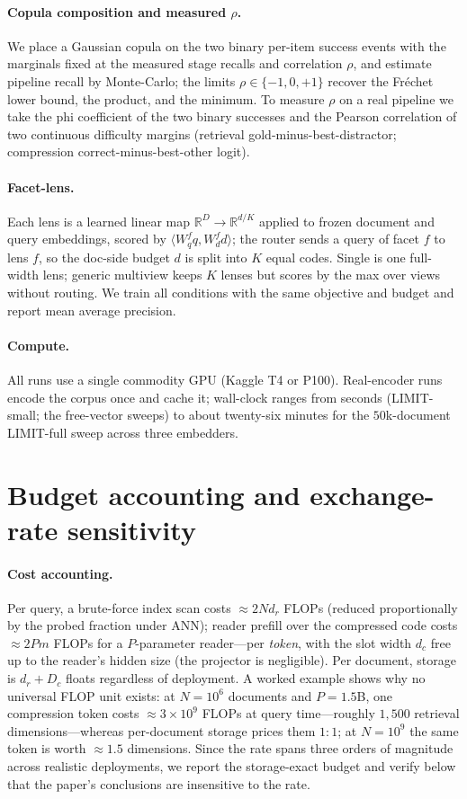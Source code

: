 \documentclass{article}
\newcommand{\dr}{d_r}
\newcommand{\dc}{d_c}
\newcommand{\R}{\mathbb{R}}
\newcommand{\ip}[2]{\langle #1, #2\rangle}
\begin{document}
\paragraph{Copula composition and measured $\rho$.} We place a Gaussian copula on the two binary
per-item success events with the marginals fixed at the measured stage recalls and correlation
$\rho$, and estimate pipeline recall by Monte-Carlo; the limits $\rho\in\{-1,0,+1\}$ recover the
Fr\'echet lower bound, the product, and the minimum. To measure $\rho$ on a real pipeline we take
the phi coefficient of the two binary successes and the Pearson correlation of two continuous
difficulty margins (retrieval gold-minus-best-distractor; compression correct-minus-best-other logit).

\paragraph{Facet-lens.} Each lens is a learned linear map $\R^{D}\!\to\!\R^{d/K}$ applied to frozen
document and query embeddings, scored by $\ip{W_q^f q}{W_d^f d}$; the router sends a query of facet
$f$ to lens $f$, so the doc-side budget $d$ is split into $K$ equal codes. Single is one full-width
lens; generic multiview keeps $K$ lenses but scores by the max over views without routing. We train
all conditions with the same objective and budget and report mean average precision.

\paragraph{Compute.} All runs use a single commodity GPU (Kaggle T4 or P100). Real-encoder runs
encode the corpus once and cache it; wall-clock ranges from seconds (LIMIT-small; the free-vector
sweeps) to about twenty-six minutes for the $50$k-document LIMIT-full sweep across three embedders.

\section{Budget accounting and exchange-rate sensitivity}
\label{app:budget}

\paragraph{Cost accounting.} Per query, a brute-force index scan costs ${\approx}2N\dr$ FLOPs
(reduced proportionally by the probed fraction under ANN); reader prefill over the compressed code
costs ${\approx}2Pm$ FLOPs for a $P$-parameter reader---per \emph{token}, with the slot width
$\dc$ free up to the reader's hidden size (the projector is negligible). Per document, storage is
$\dr+D_c$ floats regardless of deployment. A worked example shows why no universal FLOP unit
exists: at $N{=}10^6$ documents and $P{=}1.5$B, one compression token costs ${\approx}3{\times}10^9$
FLOPs at query time---roughly $1{,}500$ retrieval dimensions---whereas per-document storage prices
them $1{:}1$; at $N{=}10^9$ the same token is worth ${\approx}1.5$ dimensions. Since the rate spans
three orders of magnitude across realistic deployments, we report the storage-exact budget and
verify below that the paper's conclusions are insensitive to the rate.
\end{document}
